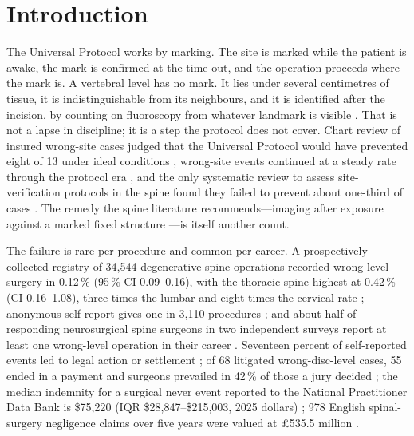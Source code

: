 \documentclass[11pt,letterpaper]{article}
\begin{document}
\clearpage

\section*{Introduction}

The Universal Protocol works by marking. The site is marked while the patient is awake, the mark is
confirmed at the time-out, and the operation proceeds where the mark is. A vertebral level has no mark. It
lies under several centimetres of tissue, it is indistinguishable from its neighbours, and it is identified
after the incision, by counting on fluoroscopy from whatever landmark is visible
\citep{strong2021,mayer2008}. That is not a lapse in discipline; it is a step the protocol does not cover.
Chart review of insured wrong-site cases judged that the Universal Protocol would have prevented eight of
13 under ideal conditions \citep{kwaan2006}, wrong-site events continued at a steady rate through the
protocol era \citep{stahel2010}, and the only systematic review to assess site-verification protocols in
the spine found they failed to prevent about one-third of cases \citep{longo2012}. The remedy the spine
literature recommends---imaging after exposure against a marked fixed structure \citep{devine2010}---is
itself another count.

The failure is rare per procedure and common per career. A prospectively collected registry of 34,544
degenerative spine operations recorded wrong-level surgery in 0.12\,\% (95\,\% CI 0.09--0.16), with the
thoracic spine highest at 0.42\,\% (CI 0.16--1.08), three times the lumbar and eight times the cervical
rate \citep{furuya2026}; anonymous self-report gives one in 3,110 procedures \citep{mody2008}; and about
half of responding neurosurgical spine surgeons in two independent surveys report at least one wrong-level
operation in their career \citep{mody2008,groff2013}. Seventeen percent of self-reported events led to
legal action or settlement \citep{mody2008}; of 68 litigated wrong-disc-level cases, 55 ended in a payment
and surgeons prevailed in 42\,\% of those a jury decided \citep{goodkin2004}; the median indemnity for a
surgical never event reported to the National Practitioner Data Bank is \$75,220 (IQR
\$28,847--\$215,003, 2025 dollars) \citep{bettis2026}; 978 English spinal-surgery negligence claims over
five years were valued at \pounds535.5 million \citep{machin2018}.
\end{document}
